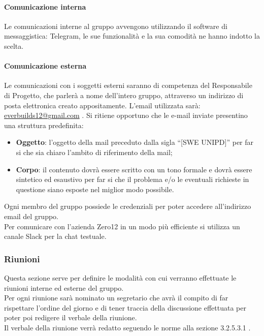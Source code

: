 			\paragraph{Comunicazione interna}
				Le comunicazioni interne al gruppo avvengono utilizzando il software di messaggistica: Telegram, le sue funzionalità e la sua comodità ne hanno indotto la scelta.
			\paragraph{Comunicazione esterna}
				Le comunicazioni con i soggetti esterni saranno di competenza del Responsabile di Progetto, che parlerà a nome dell’intero gruppo, attraverso un indirizzo di posta elettronica creato appositamente. L’email utilizzata sarà: \url{everbuilds12@gmail.com} .
				Si ritiene opportuno che le e-mail inviate presentino una struttura predefinita:
				\begin{itemize}
					\item\textbf{Oggetto}: l’oggetto della mail preceduto dalla sigla “[SWE UNIPD]” per far si che sia chiaro l’ambito di riferimento della mail;
					\item\textbf{Corpo}: il contenuto dovrà essere scritto con un tono formale e dovrà essere sintetico ed esaustivo per far si che il problema e/o le eventuali richieste in questione siano esposte nel miglior modo possibile.
				\end{itemize}
				Ogni membro del gruppo possiede le credenziali per poter accedere all’indirizzo email del gruppo.\\
				Per comunicare con l’azienda Zero12 in un modo più efficiente si utilizza un canale Slack per la chat testuale.
		\subsubsection{Riunioni}
			Questa sezione serve per definire le modalità con cui verranno effettuate le riunioni interne ed esterne del gruppo. \\
			Per ogni riunione sarà nominato un segretario che avrà il compito di far rispettare l’ordine del giorno e di tener traccia della discussione effettuata per poter poi redigere il verbale della riunione.\\
			Il verbale della riunione verrà redatto seguendo le norme alla sezione 3.2.5.3.1 .\\
